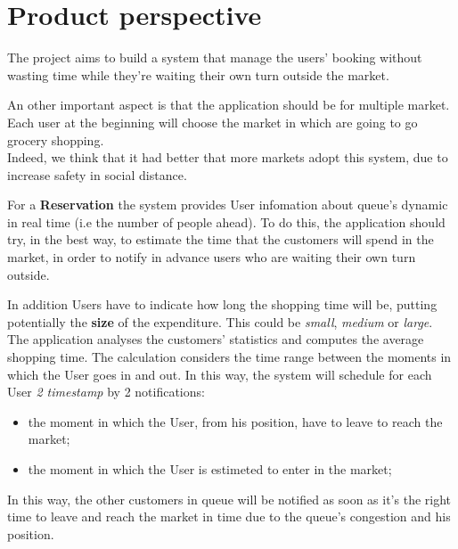 \section{Product perspective}

The project aims to build a system that manage the users’ booking without wasting time while they're waiting their own turn outside the market. 
\par
An other important aspect is that the application should be for multiple market. Each user at the beginning will choose the market in which are going to go grocery shopping.\\
Indeed, we think that it had better that more markets adopt this system, due to increase safety in social distance.
\par
For a \textbf{Reservation} the system provides User infomation about queue's dynamic in real time (i.e the number of people ahead). 
To do this, the application should try, in the best way, to estimate the time that the customers will spend in the market, in order to notify in advance users who are waiting their own turn outside. 



In addition Users have to indicate how long the shopping time will be, putting potentially the \textbf{size} of the expenditure. This could be \textit{small}, \textit{medium} or \textit{large}.
\\
The application analyses the customers’ statistics and computes the average shopping time.
The calculation considers the time range between the moments in which the User goes in and out.  
In this way, the system will schedule for each User \textit{2 timestamp} by 2 notifications:
\begin{itemize}
\item the moment in which the User, from his position, have to leave to reach the market;
\item the moment in which the User is estimeted to enter in the market;
\end{itemize}



In this way, the other customers in queue will be notified as soon as it's the right time to leave and reach the market in time due to the queue's congestion and his position.  

